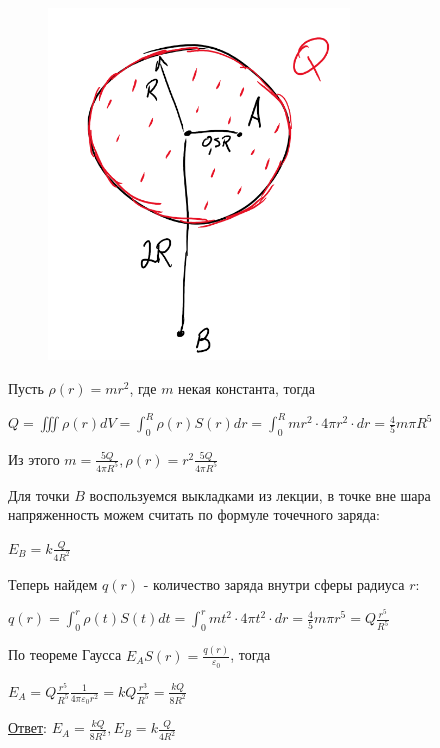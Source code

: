 \documentclass[12pt]{article}
\begin{document}
\begin{minipage}{\textwidth}
    \begin{figure}
        \includegraphics[width=8cm]{physics1/images/physics1_homework_6_4}
    \end{figure}

    Пусть $\rho(r) = mr^2$, где $m$ некая константа, тогда 

    $Q = \iiint \rho(r) dV = \int_0^R \rho(r) S(r) dr = \int_0^R mr^2 \cdot 4\pi r^2 \cdot dr = \frac{4}{5}m\pi R^5$

    Из этого $m = \frac{5Q}{4\pi R^5}, \rho(r) = r^2\frac{5Q}{4\pi R^5}$

    Для точки $B$ воспользуемся выкладками из лекции, в точке вне шара напряженность можем считать по формуле
    точечного заряда:

    $E_B = k\frac{Q}{4R^2}$

    Теперь найдем $q(r)$ - количество заряда внутри сферы радиуса $r$:

    $q(r) = \int_0^r \rho(t) S(t) dt = \int_0^r mt^2 \cdot 4\pi t^2 \cdot dr = \frac{4}{5}m\pi r^5 = Q\frac{r^5}{R^5}$

    По теореме Гаусса $E_A S(r) = \frac{q(r)}{\varepsilon_0}$, тогда 

    $E_A = Q\frac{r^5}{R^5} \frac{1}{4\pi\varepsilon_0 r^2} = kQ\frac{r^3}{R^5} = \frac{kQ}{8R^2}$

\end{minipage}

\underline{Ответ}: $E_A = \frac{kQ}{8R^2}, E_B = k\frac{Q}{4R^2}$


\clearpage

\end{document}
